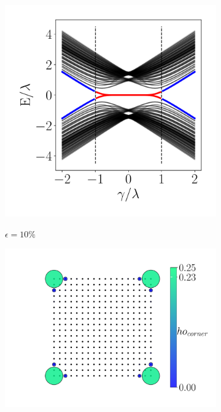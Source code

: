 \begin{figure}[h!]
     \begin{minipage}[h!]{0.7\textwidth}
         \begin{subfigure}[b!]{0.44 \textwidth}
             \caption{$\epsilon = 10\%$}
             \includegraphics[width=\textwidth]{Imagenes/Resultados_Hoti_Cuadrado/bands_square_shh_0.1.pdf}
             \label{}
         \end{subfigure}\hspace*{-0.5em}
         \begin{subfigure}[b!]{0.56 \textwidth}
             \caption*{}
             \includegraphics[width=\textwidth]{Imagenes/Resultados_Hoti_Cuadrado/proyection_square_0.1.pdf}
             \label{}
         \end{subfigure}\hspace*{-0.5em}
     \end{minipage}\vspace*{-2.5em}
     

\end{figure}
